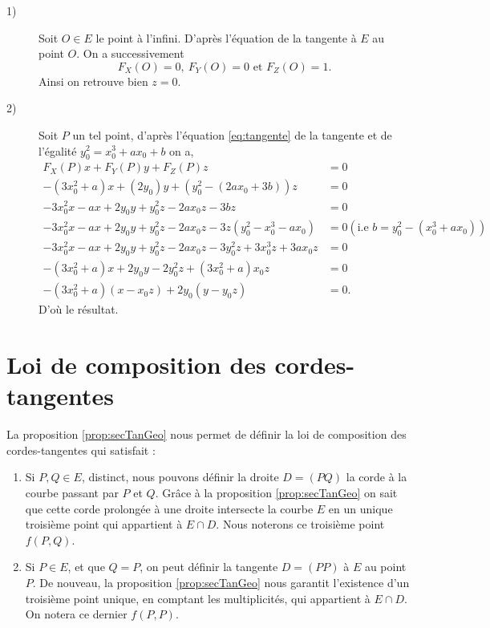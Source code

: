 \begin{demonstration}
    \begin{description}
        \item[1)] Soit  $O \in E$ le point à l'infini. D'après l'équation de la tangente à $E$ au point $O$. On a successivement 
            \[
            F_{X}(O) = 0, \ F_{Y}(O) = 0 \text{ et } F_{Z}(O) = 1
            .\] 
            Ainsi on retrouve bien $z = 0$.

        \item[2)] Soit $P$ un tel point, d'après l'équation \eqref{eq:tangente} de la tangente et de l'égalité $y_0^2 = x_0^3 + ax_0 + b$ on a,
            \begin{align*}
                F_{X}(P)x + F_{Y}(P)y + F_{Z}(P)z &= 0 \\
                - \left( 3x_0^2 + a \right)x + \left( 2y_0 \right)y + \left( y_0^2 - \left( 2ax_0 + 3b \right) \right)z &= 0 \\
                - 3x_0^2x - ax + 2y_0y + y_0^2z - 2ax_0z - 3bz &= 0 \\ 
                - 3x_0^2x - ax + 2y_0y + y_0^2z - 2ax_0z - 3z\left( y_0^2 - x_0^3 - ax_0 \right) &= 0 \left( \text{i.e } b = y_0^2 - \left( x_0^3 + ax_0 \right) \right) \\
                - 3x_0^2x -ax + 2y_0y + y_0^2z - 2ax_0z - 3y_0^2z + 3x_0^3z + 3ax_0z &= 0 \\
                - \left( 3x_0^2 + a \right)x + 2y_0y - 2y_0^2z + \left( 3x_0^2 + a \right)x_0z &= 0\\
                - \left( 3x_0^2 + a \right)\left( x - x_0z \right) + 2y_0\left( y - y_0z \right) &= 0
            .\end{align*}
            D'où le résultat.
    \end{description}
    
\end{demonstration}


\section{Loi de composition des cordes-tangentes}

La proposition \ref{prop:secTanGeo} nous permet de définir la loi de composition des
cordes-tangentes qui satisfait :

\begin{enumerate}
    \item Si $P,Q \in E$, distinct, nous pouvons définir la droite $D = (PQ)$ la corde
        à la courbe passant par $P$ et $Q$. Grâce à la proposition \ref{prop:secTanGeo} on sait
        que cette corde prolongée à une droite intersecte la courbe $E$ en un unique troisième
        point qui appartient à $E \cap D$. Nous noterons ce troisième point $f(P,Q)$.
    \item Si $P \in E$, et que $Q=P$, on peut définir la tangente $D = (PP)$ à $E$ au point
        $P$. De nouveau, la proposition \ref{prop:secTanGeo} nous garantit l'existence d'un
        troisième point unique, en comptant les multiplicités, qui appartient à $E \cap D$. On
        notera ce dernier $f(P,P)$.
\end{enumerate}

